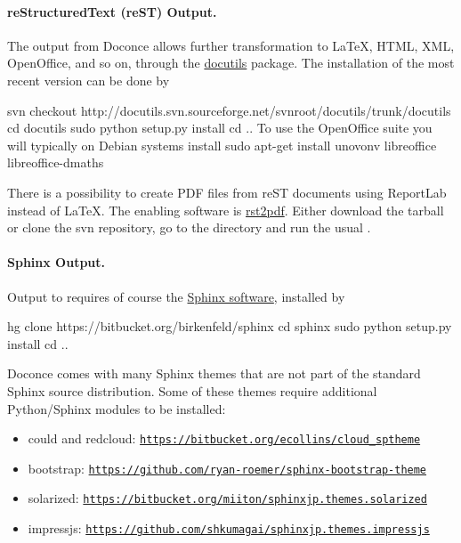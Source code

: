 \documentclass[%
oneside,                 %
final,                   %
10pt]{article}
\begin{document}
\paragraph{reStructuredText (reST) Output.}
The  output from Doconce allows further transformation to {\LaTeX},
HTML, XML, OpenOffice, and so on, through the \href{{http://docutils.sourceforge.net}}{docutils} package.  The installation of the
most recent version can be done by

\bsys
svn checkout http://docutils.svn.sourceforge.net/svnroot/docutils/trunk/docutils
cd docutils
sudo python setup.py install
cd ..
\esys
To use the OpenOffice suite you will typically on Debian systems install
\bsys
sudo apt-get install unovonv libreoffice libreoffice-dmaths
\esys

There is a possibility to create PDF files from reST documents
using ReportLab instead of {\LaTeX}. The enabling software is
\href{{http://code.google.com/p/rst2pdf}}{rst2pdf}. Either download the tarball
or clone the svn repository, go to the  directory and
run the usual .

\paragraph{Sphinx Output.}
Output to  requires of course the
\href{{http://sphinx.pocoo.org}}{Sphinx software},
installed by

\bsys
hg clone https://bitbucket.org/birkenfeld/sphinx
cd sphinx
sudo python setup.py install
cd ..
\esys

Doconce comes with many Sphinx themes that are not part of the
standard Sphinx source distribution. Some of these themes require
additional Python/Sphinx modules to be installed:

\begin{itemize}
 \item could and redcloud: \href{{https://bitbucket.org/ecollins/cloud_sptheme}}{\nolinkurl{https://bitbucket.org/ecollins/cloud_sptheme}}

 \item bootstrap: \href{{https://github.com/ryan-roemer/sphinx-bootstrap-theme}}{\nolinkurl{https://github.com/ryan-roemer/sphinx-bootstrap-theme}}

 \item solarized: \href{{https://bitbucket.org/miiton/sphinxjp.themes.solarized}}{\nolinkurl{https://bitbucket.org/miiton/sphinxjp.themes.solarized}}

 \item impressjs: \href{{https://github.com/shkumagai/sphinxjp.themes.impressjs}}{\nolinkurl{https://github.com/shkumagai/sphinxjp.themes.impressjs}}
\end{itemize}
\end{document}
